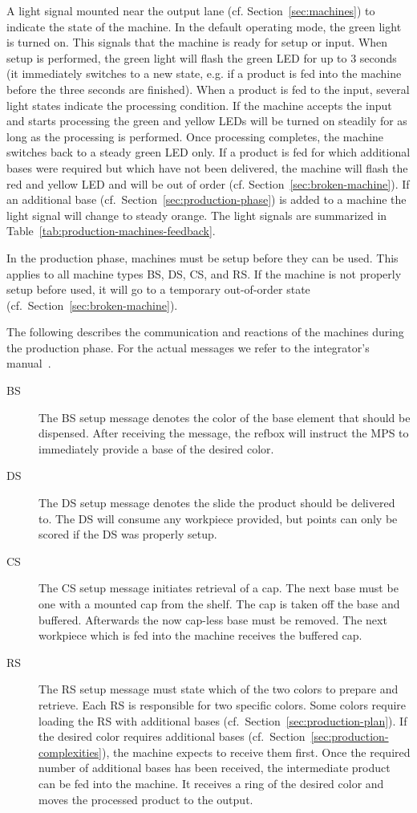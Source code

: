 \documentclass[12pt,twoside]{article}
\newcommand{\refsec}[1]{Section~\ref{#1}}
\newcommand{\reftab}[1]{Table~\ref{#1}}
\begin{document}
A light signal mounted near the output lane
(cf. \refsec{sec:machines}) to indicate the state of the machine. In
the default operating mode, the green light is turned on. This signals
that the machine is ready for setup or input. When setup is performed,
the green light will flash the green LED for up to 3 seconds (it
immediately switches to a new state, e.g. if a product is fed into the
machine before the three seconds are finished). When a product is fed
to the input, several light states indicate the processing
condition. If the machine accepts the input and starts processing the
green and yellow LEDs will be turned on steadily for as long as the
processing is performed. Once processing completes, the machine
switches back to a steady green LED only. If a product is fed for
which additional bases were required but which have not been
delivered, the machine will flash the red and yellow LED and will be
out of order (cf. \refsec{sec:broken-machine}). If an additional base
(cf.~\refsec{sec:production-phase}) is added to a machine the light
signal will change to steady orange. The light signals are summarized
in \reftab{tab:production-machines-feedback}.

In the production phase, machines must be setup before they can be
used. This applies to all machine types BS, DS, CS, and RS. If the
machine is not properly setup before used, it will go to a temporary
out-of-order state (cf.~\refsec{sec:broken-machine}).

The following describes the communication and reactions of the
machines during the production phase. For the actual messages we refer
to the integrator's manual~\cite{RefBoxIntManual}.

\begin{description}
\item[BS] The BS setup message denotes the color of the base element
  that should be dispensed. After receiving the message, the refbox
  will instruct the MPS to immediately provide a base of the desired
  color.
\item[DS] The DS setup message denotes the slide the product should be
  delivered to. The DS will consume any workpiece provided, but points
  can only be scored if the DS was properly setup.
\item[CS] The CS setup message initiates retrieval of a cap. The next
  base must be one with a mounted cap from the shelf. The cap is taken
  off the base and buffered. Afterwards the now cap-less base must be
  removed. The next workpiece which is fed into the machine receives
  the buffered cap.
\item[RS] The RS setup message must state which of the two colors to
  prepare and retrieve. Each RS is responsible for two specific
  colors. Some colors require loading the RS with additional bases
  (cf.~\refsec{sec:production-plan}). If the desired color requires
  additional bases (cf.~\refsec{sec:production-complexities}), the
  machine expects to receive them first. Once the required number of
  additional bases has been received, the intermediate product can be
  fed into the machine. It receives a ring of the desired color and
  moves the processed product to the output.
\end{description}
\end{document}
